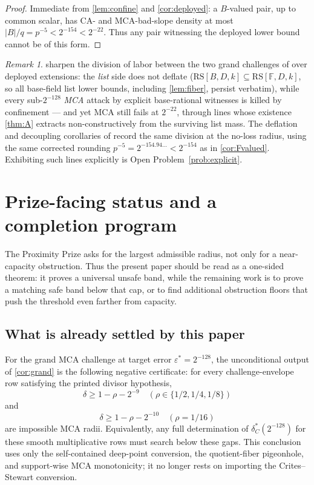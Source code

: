 \documentclass[11pt]{article}
\theoremstyle{definition}
\theoremstyle{remark}
\newtheorem{remark}[theorem]{Remark}
\newcommand{\F}{\mathbb{F}}
\newcommand{\B}{B}
\newcommand{\RS}{\mathrm{RS}}
\begin{document}
\begin{proof}
Immediate from \cref{lem:confine} and \cref{cor:deployed}: a $\B$-valued pair, up to common scalar, has CA- and MCA-bad-slope density at most $|\B|/q=p^{-5}<2^{-154}<2^{-22}$. Thus any pair witnessing the deployed lower bound cannot be of this form.
\end{proof}

\begin{remark}
 sharpen the division of labor between the two grand challenges of \cite{ABF26} over deployed extensions: the \emph{list} side does not deflate ($\RS[\B,D,k]\subseteq\RS[\F,D,k]$, so all base-field list lower bounds, including \cref{lem:fiber}, persist verbatim), while every sub-$2^{-128}$ \emph{MCA} attack by explicit base-rational witnesses is killed by confinement --- and yet MCA still fails at $2^{-22}$, through lines whose existence \cref{thm:A} extracts non-constructively from the surviving list mass. The deflation and decoupling corollaries of \cite{Cho26b} record the same division at the no-loss radius, using the same corrected rounding $p^{-5}=2^{-154.94\ldots}<2^{-154}$ as in \cref{cor:Fvalued}. Exhibiting such lines explicitly is Open Problem~\ref{prob:explicit}.
\end{remark}


\section{Prize-facing status and a completion program}\label{sec:prize-program}

The Proximity Prize asks for the largest admissible radius, not only for a
near-capacity obstruction.  Thus the present paper should be read as a
one-sided theorem: it proves a universal unsafe band, while the remaining work
is to prove a matching safe band below that cap, or to find additional
obstruction floors that push the threshold even farther from capacity.

\subsection{What is already settled by this paper}

For the grand MCA challenge at target error $\varepsilon^*=2^{-128}$, the
unconditional output of \cref{cor:grand} is the following negative certificate:
for every challenge-envelope row satisfying the printed divisor hypothesis,
\[
        \delta\ge 1-\rho-2^{-9}
        \quad(\rho\in\{1/2,1/4,1/8\})
\]
and
\[
        \delta\ge 1-\rho-2^{-10}
        \quad(\rho=1/16)
\]
are impossible MCA radii.  Equivalently, any full determination of
$\delta_C^*(2^{-128})$ for these smooth multiplicative rows must search below
these gaps.  This conclusion uses only the self-contained deep-point conversion,
the quotient-fiber pigeonhole, and support-wise MCA monotonicity; it no longer
rests on importing the Crites--Stewart conversion.
\end{document}
